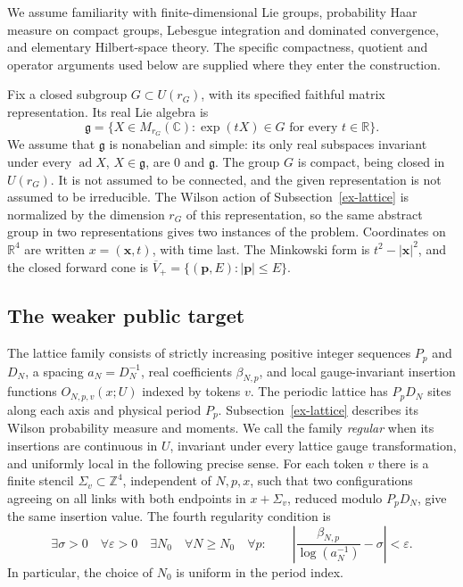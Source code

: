 We assume familiarity with finite-dimensional Lie groups, probability Haar
measure on compact groups, Lebesgue integration and dominated convergence,
and elementary Hilbert-space theory. The specific compactness, quotient and
operator arguments used below are supplied where they enter the construction.

Fix a closed subgroup \(G\subset U(r_G)\), with its specified faithful matrix
representation. Its real Lie algebra is
\[
 \mathfrak g=\{X\in M_{r_G}(\mathbb C):\exp(tX)\in G
                       \text{ for every }t\in\mathbb R\}.
\]
We assume that \(\mathfrak g\) is nonabelian and simple: its only real
subspaces invariant under every \(\operatorname{ad}X\), \(X\in\mathfrak g\),
are \(0\) and \(\mathfrak g\). The group \(G\) is compact, being closed in
\(U(r_G)\). It is not assumed to be connected, and the given representation
is not assumed to be irreducible. The Wilson action of
Subsection~\ref{ex-lattice} is normalized by the dimension \(r_G\) of this
representation, so the same abstract group in two representations gives two
instances of the problem. Coordinates on \(\mathbb R^4\) are written
\(x=(\boldsymbol x,t)\), with time last. The Minkowski form is
\(t^2-|\boldsymbol x|^2\), and the closed forward cone is
\(\overline V_+=\{(\boldsymbol p,E):|\boldsymbol p|\le E\}\).



\subsection{The weaker public target}

The lattice family consists of strictly increasing positive integer sequences
\(P_p\) and \(D_N\), a spacing \(a_N=D_N^{-1}\), real coefficients
\(\beta_{N,p}\), and local gauge-invariant insertion functions
\(O_{N,p,v}(x;U)\) indexed by tokens \(v\). The periodic lattice has
\(P_pD_N\) sites along each axis and physical period \(P_p\).
Subsection~\ref{ex-lattice} describes its Wilson probability measure and moments.
We call the family \emph{regular} when its insertions are continuous in
\(U\), invariant under every lattice gauge transformation, and uniformly
local in the following precise sense. For each token \(v\) there is a finite
stencil \(\Sigma_v\subset\mathbb Z^4\), independent of \(N,p,x\), such
that two configurations agreeing on all links with both endpoints in
\(x+\Sigma_v\), reduced modulo \(P_pD_N\), give the same insertion value.
The fourth regularity condition is
\begin{equation}\label{ex-running-input}
 \exists\sigma>0\quad\forall\varepsilon>0\quad\exists N_0\quad
 \forall N\ge N_0\quad\forall p:\qquad
 \left|\frac{\beta_{N,p}}{\log(a_N^{-1})}-\sigma\right|<\varepsilon.
\end{equation}
In particular, the choice of \(N_0\) is uniform in the period index.

